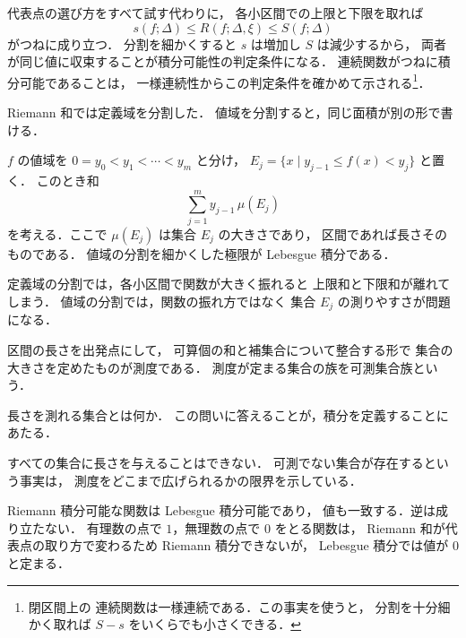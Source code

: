 \documentclass[lualatex,paper=b5j,fontsize=10pt,twoside]{jlreq}
\begin{document}

代表点の選び方をすべて試す代わりに，
各小区間での上限と下限を取れば
\begin{equation}
  s(f;\Delta)\leq R(f;\Delta,\xi)\leq S(f;\Delta)
\end{equation}
がつねに成り立つ．
分割を細かくすると $s$ は増加し $S$ は減少するから，
両者が同じ値に収束することが積分可能性の判定条件になる．
連続関数がつねに積分可能であることは，
一様連続性からこの判定条件を確かめて示される\footnote{閉区間上の
連続関数は一様連続である．この事実を使うと，
分割を十分細かく取れば $S-s$ をいくらでも小さくできる．}．


Riemann 和では定義域を分割した．
値域を分割すると，同じ面積が別の形で書ける．


$f$ の値域を $0=y_0<y_1<\cdots<y_m$ と分け，
$E_j=\{x\mid y_{j-1}\leq f(x)<y_j\}$ と置く．
このとき和
\begin{equation}
  \sum_{j=1}^{m}y_{j-1}\,\mu(E_j)
\end{equation}
を考える．ここで $\mu(E_j)$ は集合 $E_j$ の大きさであり，
区間であれば長さそのものである．
値域の分割を細かくした極限が Lebesgue 積分である．

\begin{mkremark}
定義域の分割では，各小区間で関数が大きく振れると
上限和と下限和が離れてしまう．
値域の分割では，関数の振れ方ではなく
集合 $E_j$ の測りやすさが問題になる．
\end{mkremark}


区間の長さを出発点にして，
可算個の和と補集合について整合する形で
集合の大きさを定めたものが測度である．
測度が定まる集合の族を可測集合族という．

\begin{mkquote}
長さを測れる集合とは何か．
この問いに答えることが，積分を定義することにあたる．
\end{mkquote}

すべての集合に長さを与えることはできない．
可測でない集合が存在するという事実は，
測度をどこまで広げられるかの限界を示している．


Riemann 積分可能な関数は Lebesgue 積分可能であり，
値も一致する．逆は成り立たない．
有理数の点で $1$，無理数の点で $0$ をとる関数は，
Riemann 和が代表点の取り方で変わるため Riemann 積分できないが，
Lebesgue 積分では値が $0$ と定まる．
\end{document}

